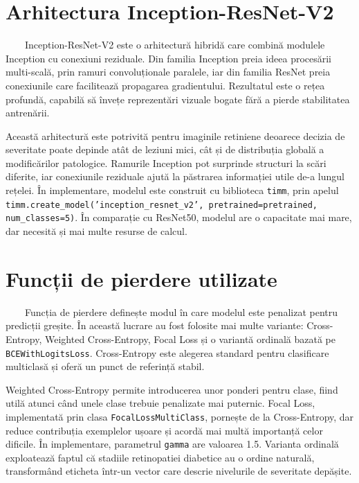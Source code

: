 \documentclass[12pt, a4paper, oneside, romanian]{teza-upb}
\begin{document}
\section{Arhitectura Inception-ResNet-V2}

\ \ \ \ Inception-ResNet-V2 este o arhitectură hibridă care combină modulele Inception cu conexiuni reziduale. Din familia Inception preia ideea procesării multi-scală, prin ramuri convoluționale paralele, iar din familia ResNet preia conexiunile care facilitează propagarea gradientului. Rezultatul este o rețea profundă, capabilă să învețe reprezentări vizuale bogate fără a pierde stabilitatea antrenării.
\bigskip

Această arhitectură este potrivită pentru imaginile retiniene deoarece decizia de severitate poate depinde atât de leziuni mici, cât și de distribuția globală a modificărilor patologice. Ramurile Inception pot surprinde structuri la scări diferite, iar conexiunile reziduale ajută la păstrarea informației utile de-a lungul rețelei. În implementare, modelul este construit cu biblioteca \texttt{timm}, prin apelul \texttt{timm.create\_model('inception\_resnet\_v2', pretrained=pretrained, num\_classes=5)}. În comparație cu ResNet50, modelul are o capacitate mai mare, dar necesită și mai multe resurse de calcul.

\section{Funcții de pierdere utilizate}

\ \ \ \ Funcția de pierdere definește modul în care modelul este penalizat pentru predicții greșite. În această lucrare au fost folosite mai multe variante: Cross-Entropy, Weighted Cross-Entropy, Focal Loss și o variantă ordinală bazată pe \texttt{BCEWithLogitsLoss}. Cross-Entropy este alegerea standard pentru clasificare multiclasă și oferă un punct de referință stabil.
\bigskip

Weighted Cross-Entropy permite introducerea unor ponderi pentru clase, fiind utilă atunci când unele clase trebuie penalizate mai puternic. Focal Loss, implementată prin clasa \texttt{FocalLossMultiClass}, pornește de la Cross-Entropy, dar reduce contribuția exemplelor ușoare și acordă mai multă importanță celor dificile. În implementare, parametrul \texttt{gamma} are valoarea 1.5. Varianta ordinală exploatează faptul că stadiile retinopatiei diabetice au o ordine naturală, transformând eticheta într-un vector care descrie nivelurile de severitate depășite.
\end{document}

